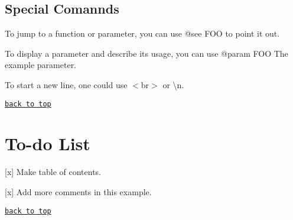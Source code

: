 \subsection*{Special Comannds}


\begin{DoxyEnumerate}
\item To jump to a function or parameter, you can use {\ttfamily @see F\+OO} to point it out.
\item To display a parameter and describe its usage, you can use {\ttfamily @param F\+OO The example parameter.}
\item To start a new line, one could use {\ttfamily $<$br$>$} or {\ttfamily \textbackslash{}n}.
\end{DoxyEnumerate}

\href{#contents}{\tt back to top}

\section*{To-\/do List}


\begin{DoxyItemize}
\item \mbox{[}x\mbox{]} Make table of contents.
\item \mbox{[}x\mbox{]} Add more comments in this example.
\end{DoxyItemize}

\href{#contents}{\tt back to top} 